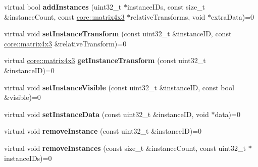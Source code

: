 \begin{DoxyCompactItemize}
\item 
virtual bool {\bfseries add\+Instances} (uint32\+\_\+t $\ast$instance\+I\+Ds, const size\+\_\+t \&instance\+Count, const \hyperlink{classirr_1_1core_1_1matrix4x3}{core\+::matrix4x3} $\ast$relative\+Transforms, void $\ast$extra\+Data)=0\hypertarget{classirr_1_1scene_1_1IMeshSceneNodeInstanced_a740f777188464b4d5a50665e791f2fa2}{}\label{classirr_1_1scene_1_1IMeshSceneNodeInstanced_a740f777188464b4d5a50665e791f2fa2}

\item 
virtual void {\bfseries set\+Instance\+Transform} (const uint32\+\_\+t \&instance\+ID, const \hyperlink{classirr_1_1core_1_1matrix4x3}{core\+::matrix4x3} \&relative\+Transform)=0\hypertarget{classirr_1_1scene_1_1IMeshSceneNodeInstanced_afb2a08615a4c15419692b247f7db4764}{}\label{classirr_1_1scene_1_1IMeshSceneNodeInstanced_afb2a08615a4c15419692b247f7db4764}

\item 
virtual \hyperlink{classirr_1_1core_1_1matrix4x3}{core\+::matrix4x3} {\bfseries get\+Instance\+Transform} (const uint32\+\_\+t \&instance\+ID)=0\hypertarget{classirr_1_1scene_1_1IMeshSceneNodeInstanced_a34217ec376a4097c60de88733daedfc6}{}\label{classirr_1_1scene_1_1IMeshSceneNodeInstanced_a34217ec376a4097c60de88733daedfc6}

\item 
virtual void {\bfseries set\+Instance\+Visible} (const uint32\+\_\+t \&instance\+ID, const bool \&visible)=0\hypertarget{classirr_1_1scene_1_1IMeshSceneNodeInstanced_a06cb1420110581c3821f86b4b6effd5f}{}\label{classirr_1_1scene_1_1IMeshSceneNodeInstanced_a06cb1420110581c3821f86b4b6effd5f}

\item 
virtual void {\bfseries set\+Instance\+Data} (const uint32\+\_\+t \&instance\+ID, void $\ast$data)=0\hypertarget{classirr_1_1scene_1_1IMeshSceneNodeInstanced_a3b535fa76b0d45c19fd13e72056e66b4}{}\label{classirr_1_1scene_1_1IMeshSceneNodeInstanced_a3b535fa76b0d45c19fd13e72056e66b4}

\item 
virtual void {\bfseries remove\+Instance} (const uint32\+\_\+t \&instance\+ID)=0\hypertarget{classirr_1_1scene_1_1IMeshSceneNodeInstanced_a9b28f8201e65c59ad64121888c2da7c9}{}\label{classirr_1_1scene_1_1IMeshSceneNodeInstanced_a9b28f8201e65c59ad64121888c2da7c9}

\item 
virtual void {\bfseries remove\+Instances} (const size\+\_\+t \&instance\+Count, const uint32\+\_\+t $\ast$instance\+I\+Ds)=0\hypertarget{classirr_1_1scene_1_1IMeshSceneNodeInstanced_afae67cfe034812560fb6b5083844d33a}{}\label{classirr_1_1scene_1_1IMeshSceneNodeInstanced_afae67cfe034812560fb6b5083844d33a}

\end{DoxyCompactItemize}
